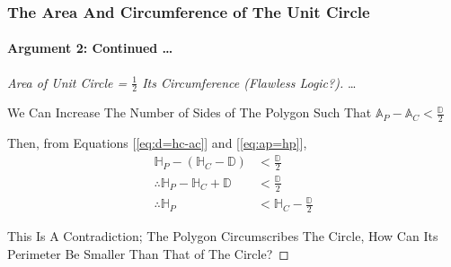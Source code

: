 \begin{frame}
\frametitle{The Area And Circumference of The Unit Circle}
\framesubtitle{Argument 2: Continued \dots}
\label{slide:arg-2-archimedes-3}
\begin{proof}[Area of Unit Circle = $\frac{1}{2}$ Its Circumference ({\tiny Flawless Logic?})]
\let\qed\relax %
\dots

We Can Increase The Number of Sides of The Polygon Such That $\mathbb{A}_P-\mathbb{A}_C<\frac{\mathbb{D}}{2}$

Then, from Equations [\ref{eq:d=hc-ac}] and [\ref{eq:ap=hp}],
\begin{equation}
\begin{aligned}
\mathbb{H}_P-(\mathbb{H}_C-\mathbb{D})&<\frac{\mathbb{D}}{2}\\
\therefore\mathbb{H}_P-\mathbb{H}_C+\mathbb{D}&<\frac{\mathbb{D}}{2}\\
\therefore\mathbb{H}_P&<\mathbb{H}_C-\frac{\mathbb{D}}{2}
\end{aligned}
\end{equation}

This Is A Contradiction; The Polygon Circumscribes The Circle, How Can Its Perimeter Be Smaller Than That of The Circle?

\end{proof}
\end{frame}
